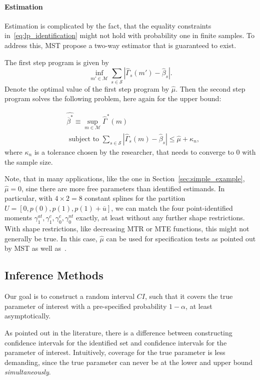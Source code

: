 \documentclass[12pt,a4paper,english]{article} %
\numberwithin{equation}{section}
\theoremstyle{definition}
\theoremstyle{remark}
\theoremstyle{plain}
\begin{document}
\paragraph{Estimation}
Estimation is complicated by the fact, that the equality constraints in~\ref{eq:lp_identification} might not hold with probability one in finite samples.
To address this, MST propose a two-way estimator that is guaranteed to exist.

The first step program is given by
\begin{equation*}\label{eq:lp_estimation_fs}
  \inf_{m'\in \mathcal{M}} \sum_{s\in\mathcal{S}}|\hat{\Gamma}_s(m') - \hat{\beta}_s|.
\end{equation*}
Denote the optimal value of the first step program by $\hat{\mu}$.
Then the second step program solves the following problem, here again for the upper bound:

\begin{align}\label{eq:lp_estimation}
  & \hat{\overline{\beta}^*} \equiv \sup_{m\in \mathcal{M}}\hat{\Gamma}^*(m) \\
  & \text{ subject to } \sum_{s\in\mathcal{S}}|\hat{\Gamma}_s(m) - \hat{\beta}_s| \leq \hat{\mu} + \kappa_n,
\end{align}
where $\kappa_n$ is a tolerance chosen by the researcher, that needs to converge to $0$ with the sample size.

Note, that in many applications, like the one in Section~\ref{sec:simple_example}, $\hat{\mu} = 0$, sine there are more free parameters than identified estimands.
In particular, with $4\times2=8$ constant splines for the partition $U = [0, p(0), p(1), p(1) + \overline{u}]$, we can match the four point-identified moments $\gamma_1^{at}, \gamma_1^c, \gamma_0^c, \gamma_0^{nt}$ exactly, at least without any further shape restrictions.
With shape restrictions, like decreasing MTR or MTE functions, this might not generally be true.
In this case, $\hat{\mu}$ can be used for specification tests as pointed out by MST as well as~\cite{shea2023ivmte}.


\subsection{Inference Methods}\label{sec:inference_methods}
Our goal is to construct a random interval $CI$, such that it covers the true parameter of interest with a pre-specified probability $1-\alpha$, at least asymptotically.

As pointed out in the literature, there is a difference between constructing confidence intervals for the identified set and confidence intervals for the parameter of interest.
Intuitively, coverage for the true parameter is less demanding, since the true parameter can never be at the lower and upper bound \textit{simultaneously}.
\end{document}
